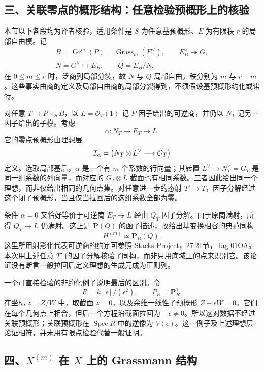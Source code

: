 \documentclass[UTF8,a4paper]{ctexbook}
\DeclareMathOperator{\Spec}{Spec}
\let\Im\relax
\DeclareMathOperator{\Im}{Im}
\newcommand{\Gr}{\operatorname{Gr}}
\begin{document}
\subsection*{三、关联零点的概形结构：任意检验预概形上的核验}

本节以下各段均为译者核验，适用条件是 $S$ 为任意基预概形、$E$ 为有限秩 $r$ 的局部自由模。记
\[
\begin{gathered}
B=\Gr^m(P)=\operatorname{Grass}_m(E^\vee),\qquad E_B^\vee\twoheadrightarrow G,\\
N=G^\vee\hookrightarrow E_B,\qquad Q=E_B/N.
\end{gathered}
\]
在 $0\leq m\leq r$ 时，泛商列局部分裂，故 $N$ 与 $Q$ 局部自由，秩分别为 $m$ 与 $r-m$。这些事实由商的定义及局部自由商的局部分裂得到，不须假设基预概形约化或诺特。

对任意 $T\to P\times_S B$，以 $L=\mathcal O_T(1)$ 记 $P$ 因子给出的可逆商，并仍以 $N_T$ 记另一因子给出的子模。考虑
\[
\alpha:N_T\longrightarrow E_T\longrightarrow L.
\]
它的零点预概形由理想层
\[
\mathcal I_\alpha=
\Im\bigl(N_T\otimes L^\vee\longrightarrow\mathcal O_T\bigr)
\]
定义。选取局部基后，$\alpha$ 是一个有 $m$ 个系数的行向量；其转置 $L^\vee\to N_T^\vee=G_T$ 是同一组系数的列向量，而对应的 $G_T\otimes L$ 截面也有相同系数。三者因此给出同一个理想，而非仅给出相同的几何点集。对任意进一步的态射 $T'\to T$，因子分解经过这个闭子预概形，当且仅当拉回后的这组系数全部为零。

条件 $\alpha=0$ 又恰好等价于可逆商 $E_T\twoheadrightarrow L$ 经由 $Q_T$ 因子分解。由于原商满射，所得 $Q_T\to L$ 仍满射。这正是 $\mathbf P(Q)$ 的函子描述，故给出基变换相容的典范同构
\[
H^{(m)}\simeq\mathbf P_B(Q).
\]
这里所用射影化代表可逆商的约定可参照
\href{https://stacks.math.columbia.edu/tag/01OA}{Stacks Project，27.21节，Tag 01OA}。
本次用上述任意 $T'$ 的因子分解核验了同构，而非只用底域上的点来识别它。该论证没有断言一般拉回后定义理想的生成元成为正则列。

一个可直接检验的非约化例子说明最后的区别。令
\[
R=k[\epsilon]/(\epsilon^2),\qquad P_R=\mathbf P^1_R.
\]
在坐标 $z=Z/W$ 中，取截面 $z=0$，以及余维一线性子预概形 $Z-\epsilon W=0$。它们在每个几何点上相合，但后一个方程沿截面拉回为 $-\epsilon\ne0$。所以这对数据不经过关联预概形；关联预概形在 $\Spec R$ 中的逆像为 $V(\epsilon)$。这一例子及上述理想层论证相符，并未用有限点检验代替一般证明。

\subsection*{四、$X^{(m)}$ 在 $X$ 上的 Grassmann 结构}
\end{document}
